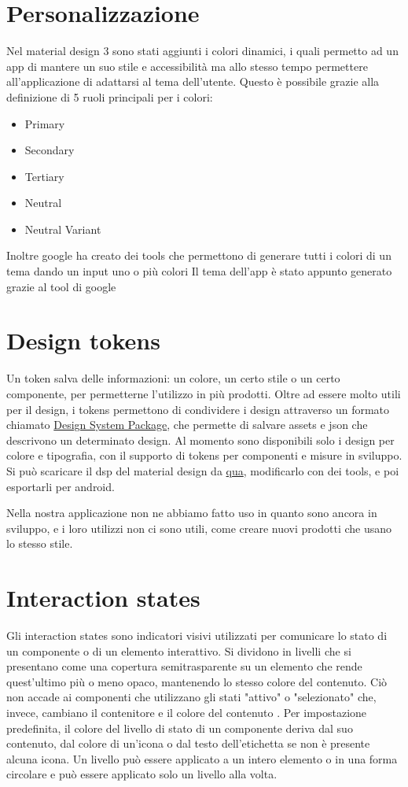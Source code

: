 \documentclass[12pt, a4paper]{report}
\begin{document}
	\section{Personalizzazione}
		Nel material design 3 sono stati aggiunti i colori dinamici, i quali permetto ad un app di mantere un suo stile e accessibilità ma allo stesso tempo permettere all'applicazione di adattarsi al tema dell'utente.
		Questo è possibile grazie alla definizione di 5 ruoli principali per i colori:
		\begin{itemize}
			\item Primary
			\item Secondary
			\item Tertiary
			\item Neutral
			\item Neutral Variant
		\end{itemize}
		Inoltre google ha creato dei tools che permettono di generare tutti i colori di un tema dando un input uno o più colori
		Il tema dell'app è stato appunto generato grazie al tool di google
		
	\section{Design tokens}
		Un token salva delle informazioni: un colore, un certo stile o un certo componente, per permetterne l'utilizzo in più prodotti.
		Oltre ad essere molto utili per il design, i tokens permettono di condividere i design attraverso un formato chiamato \href{https://github.com/AdobeXD/design-system-package-dsp}{Design System Package},
		che permette di salvare assets e json che descrivono un determinato design.
		Al momento sono disponibili solo i design per colore e tipografia, con il supporto di tokens per componenti e misure in sviluppo. Si può scaricare il dsp del material design da \href{https://github.com/material-foundation/material-tokens}{qua}, modificarlo con dei tools, e poi esportarli per android.
		
		Nella nostra applicazione non ne abbiamo fatto uso in quanto sono ancora in sviluppo, e i loro utilizzi non ci sono utili, come creare nuovi prodotti che usano lo stesso stile.

	\section{Interaction states}
	Gli interaction states sono indicatori visivi utilizzati per comunicare lo stato di un componente o di un elemento interattivo. Si dividono in livelli che si presentano come una  copertura semitrasparente su un elemento che rende quest'ultimo più o meno opaco, mantenendo lo stesso colore del contenuto.
	Ciò non accade ai componenti che utilizzano gli stati "attivo" o "selezionato" che, invece, cambiano il contenitore e il colore del contenuto .
	Per impostazione predefinita, il colore del livello di stato di un componente deriva dal suo contenuto, dal colore di un'icona o dal testo dell'etichetta se non è presente alcuna icona.
	Un livello può essere applicato a un intero elemento o in una forma circolare e può essere applicato solo un livello alla volta.
	
\end{document}
